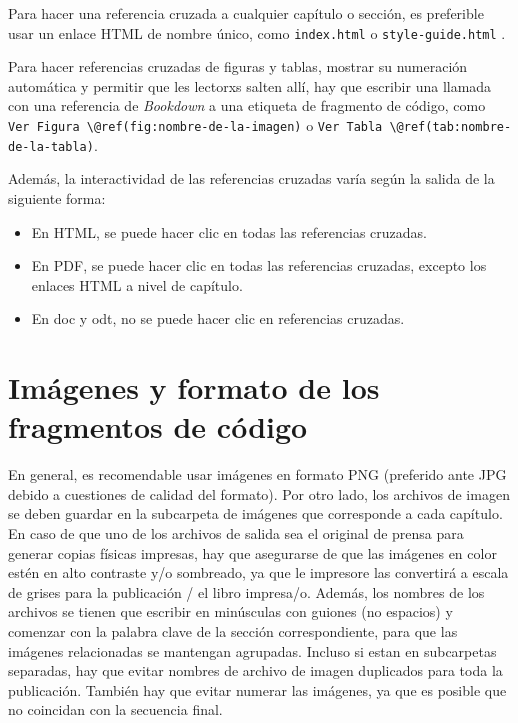 \documentclass[
]{book}
\begin{document}
Para hacer una referencia cruzada a cualquier capítulo o sección, es preferible usar un enlace HTML de nombre único, como \texttt{index.html} o \texttt{style-guide.html} .

Para hacer referencias cruzadas de figuras y tablas, mostrar su numeración automática y permitir que les lectorxs salten allí, hay que escribir una llamada con una referencia de \emph{Bookdown} a una etiqueta de fragmento de código, como \texttt{Ver\ Figura\ \textbackslash{}@ref(fig:nombre-de-la-imagen)} o \texttt{Ver\ Tabla\ \textbackslash{}@ref(tab:nombre-de-la-tabla)}.

Además, la interactividad de las referencias cruzadas varía según la salida de la siguiente forma:

\begin{itemize}
\item
  En HTML, se puede hacer clic en todas las referencias cruzadas.
\item
  En PDF, se puede hacer clic en todas las referencias cruzadas, excepto los enlaces HTML a nivel de capítulo.
\item
  En doc y odt, no se puede hacer clic en referencias cruzadas.
\end{itemize}

\hypertarget{imuxe1genes-y-formato-de-los-fragmentos-de-cuxf3digo}{%
\section{Imágenes y formato de los fragmentos de código}\label{imuxe1genes-y-formato-de-los-fragmentos-de-cuxf3digo}}

En general, es recomendable usar imágenes en formato PNG (preferido ante JPG debido a cuestiones de calidad del formato). Por otro lado, los archivos de imagen se deben guardar en la subcarpeta de imágenes que corresponde a cada capítulo. En caso de que uno de los archivos de salida sea el original de prensa para generar copias físicas impresas, hay que asegurarse de que las imágenes en color estén en alto contraste y/o sombreado, ya que le impresore las convertirá a escala de grises para la publicación / el libro impresa/o. Además, los nombres de los archivos se tienen que escribir en minúsculas con guiones (no espacios) y comenzar con la palabra clave de la sección correspondiente, para que las imágenes relacionadas se mantengan agrupadas. Incluso si estan en subcarpetas separadas, hay que evitar nombres de archivo de imagen duplicados para toda la publicación. También hay que evitar numerar las imágenes, ya que es posible que no coincidan con la secuencia final.
\end{document}
